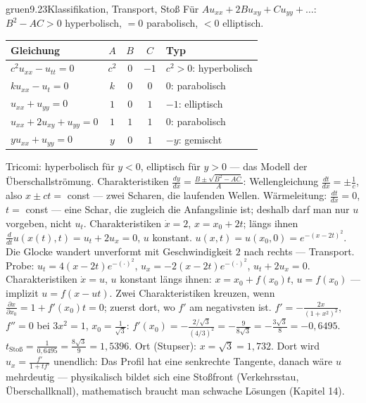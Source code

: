 \begin{loesungkarte}{gruen}{9.23}{Klassifikation, Transport, Stoß}
Für $Au_{xx} + 2Bu_{xy} + Cu_{yy} + \dots$: $B^{2} - AC > 0$ hyperbolisch, $= 0$ parabolisch, $< 0$ elliptisch.
\begin{center}\small
\begin{tabular}{l|ccc|l}
Gleichung & $A$ & $B$ & $C$ & Typ\\ \hline
$c^{2}u_{xx} - u_{tt} = 0$ & $c^{2}$ & $0$ & $-1$ & $c^{2} > 0$: hyperbolisch\\
$ku_{xx} - u_t = 0$ & $k$ & $0$ & $0$ & $0$: parabolisch\\
$u_{xx} + u_{yy} = 0$ & $1$ & $0$ & $1$ & $-1$: elliptisch\\
$u_{xx} + 2u_{xy} + u_{yy} = 0$ & $1$ & $1$ & $1$ & $0$: parabolisch\\
$yu_{xx} + u_{yy} = 0$ & $y$ & $0$ & $1$ & $-y$: gemischt
\end{tabular}
\end{center}
Tricomi: hyperbolisch für $y < 0$, elliptisch für $y > 0$ --- das Modell der Überschallströmung. Charakteristiken $\frac{dy}{dx} = \frac{B\pm\sqrt{B^{2} - AC}}A$: Wellengleichung $\frac{dt}{dx} = \pm\frac1c$, also $x\pm ct = $ const --- zwei Scharen, die laufenden Wellen. Wärmeleitung: $\frac{dt}{dx} = 0$, $t = $ const --- eine Schar, die zugleich die Anfangslinie ist; deshalb darf man nur $u$ vorgeben, nicht $u_t$.
Charakteristiken $\dot x = 2$, $x = x_0 + 2t$; längs ihnen $\frac d{dt}u(x(t), t) = u_t + 2u_x = 0$, $u$ konstant. $u(x, t) = u(x_0, 0) = e^{-(x - 2t)^{2}}$. Die Glocke wandert unverformt mit Geschwindigkeit $2$ nach rechts --- Transport. Probe: $u_t = 4(x - 2t)e^{-(\cdot)^{2}}$, $u_x = -2(x - 2t)e^{-(\cdot)^{2}}$, $u_t + 2u_x = 0$. \checkmark
{}
Charakteristiken $\dot x = u$, $u$ konstant längs ihnen: $x = x_0 + f(x_0)t$, $u = f(x_0)$ --- implizit $u = f(x - ut)$. Zwei Charakteristiken kreuzen, wenn $\frac{\partial x}{\partial x_0} = 1 + f'(x_0)t = 0$; zuerst dort, wo $f'$ am negativsten ist. $f' = -\frac{2x}{(1 + x^{2})^{2}}$, $f'' = 0$ bei $3x^{2} = 1$, $x_0 = \frac1{\sqrt3}$: $f'(x_0) = -\frac{2/\sqrt3}{(4/3)^{2}} = -\frac{9}{8\sqrt3} = -\frac{3\sqrt3}8 = -0{,}6495$. $t_{\text{Stoß}} = \frac1{0{,}6495} = \frac{8\sqrt3}9 = 1{,}5396$. Ort (Stupser): $x = \sqrt3 = 1{,}732$. Dort wird $u_x = \frac{f'}{1 + tf'}$ unendlich: Das Profil hat eine senkrechte Tangente, danach wäre $u$ mehrdeutig --- physikalisch bildet sich eine Stoßfront (Verkehrsstau, Überschallknall), mathematisch braucht man schwache Lösungen (Kapitel 14).

\end{loesungkarte}

